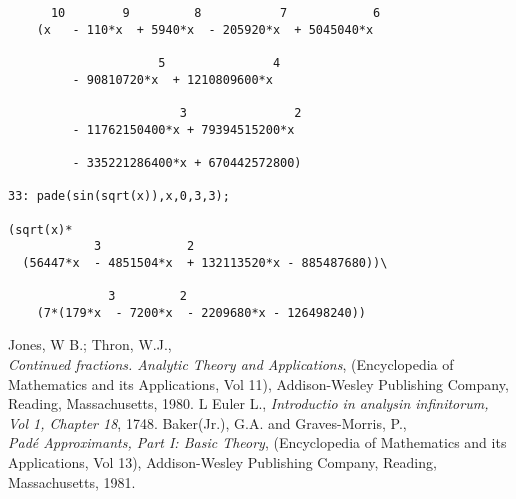 \documentclass[11pt,a4paper]{article}
\begin{document}
\begin{verbatim}
      10        9         8           7            6
    (x   - 110*x  + 5940*x  - 205920*x  + 5045040*x

                     5               4
         - 90810720*x  + 1210809600*x 

                        3               2
         - 11762150400*x + 79394515200*x  

         - 335221286400*x + 670442572800)

33: pade(sin(sqrt(x)),x,0,3,3);
        
(sqrt(x)*
            3            2
  (56447*x  - 4851504*x  + 132113520*x - 885487680))\

              3         2
    (7*(179*x  - 7200*x  - 2209680*x - 126498240))
\end{verbatim}

\begin{thebibliography}{9}
 Jones, W B.; Thron, W.J., \\
{\it Continued fractions. Analytic Theory and Applications},
 (Encyclopedia of Mathematics and its Applications, Vol 11),
Addison-Wesley Publishing Company, Reading, Massachusetts, 1980.
 L Euler L., {\it Introductio in analysin infinitorum, Vol 1,
 Chapter 18}, 1748.
 Baker(Jr.), G.A. and Graves-Morris, P.,\\
{\it Pad\'{e} Approximants, Part I: Basic Theory},
(Encyclopedia of Mathematics and its Applications, Vol 13),
Addison-Wesley Publishing Company, Reading, Massachusetts, 1981.
\end{thebibliography}
\end{document}
